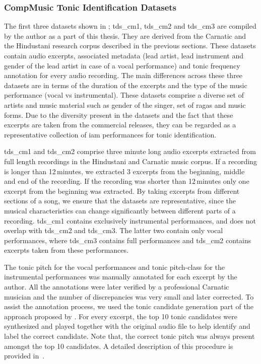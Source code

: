{%


\subsubsection{CompMusic Tonic Identification Datasets}
\label{sec:corpus_compmusic_tonic_dataset}

The first three datasets shown in ; \acrshort{tds_cm1}, \acrshort{tds_cm2} and \acrshort{tds_cm3} are compiled by the author as a part of this thesis. They are derived from the Carnatic and the Hindustani research corpus described in the previous sections. These datasets contain audio excerpts, associated metadata (lead artist, lead instrument and gender of the lead artist in case of a vocal performance) and tonic frequency annotation for every audio recording. The main differences across these three datasets are in terms of the duration of the excerpts and the type of the music performance (vocal vs instrumental). These datasets comprise a diverse set of artists and music material such as gender of the singer, set of \glspl{raga} and music forms. Due to the diversity present in the datasets and the fact that these excerpts are taken from the commercial releases, they can be regarded as a representative collection of \gls{iam} performances for tonic identification.  

\acrshort{tds_cm1} and \acrshort{tds_cm2} comprise three minute long audio excerpts extracted from full length recordings in the Hindustani and Carnatic music corpus. If a recording is longer than 12\,minutes, we extracted 3 excerpts from the beginning, middle and end of the recording. If the recording was shorter than 12\,minutes only one excerpt from the beginning was extracted. By taking excerpts from different sections of a song, we ensure that the datasets are representative, since the musical characteristics can change significantly between different parts of a recording. \acrshort{tds_cm1} contains exclusively instrumental performances, and does not overlap with \acrshort{tds_cm2} and \acrshort{tds_cm3}. The latter two contain only vocal performances, where \acrshort{tds_cm3} contains full performances and \acrshort{tds_cm2} contains excerpts taken from these performances. 

The tonic pitch for the vocal performances and tonic pitch-class for the instrumental performances was manually annotated for each excerpt by the author. All the annotations were later verified by a professional Carnatic musician and the number of discrepancies was very small and later corrected. To assist the annotation process, we used the tonic candidate generation part of the approach proposed by \cite{salamon2012multipitch}. For every excerpt, the top 10 tonic candidates were synthesized and played together with the original audio file to help identify and label the correct candidate. Note that, the correct tonic pitch was always present amongst the top 10 candidates. A detailed description of this procedure is provided in~\cite{SGulati_MThesis2012}.

}
